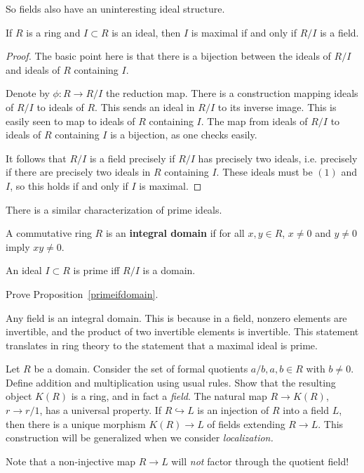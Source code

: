 So fields also have an uninteresting ideal structure.

\begin{corollary} If $R$ is a ring and $I \subset R$ is an ideal, then $I$ is
maximal if and only if $R/I$ is a field. \end{corollary}

\begin{proof} The basic point here is that there is a bijection between the
ideals of $R/I$ and ideals of $R$ containing $I$.

Denote by $\phi: R \to R/I$ the reduction map. There is a construction mapping
ideals of $R/I$ to ideals of $R$. This sends an ideal in $R/I$ to its inverse
image. This is easily seen to map to ideals of $R$ containing $I$. The map from
ideals of $R/I$ to ideals of $R$ containing $I$ is a bijection, as one checks
easily.

It follows that $R/I$ is a field precisely if $R/I$ has precisely two ideals,
i.e. precisely if there are precisely two ideals in $R$ containing $I$. These
ideals must be $(1)$ and $I$, so this holds if and only if $I$ is maximal.

\end{proof}

There is a similar characterization of prime ideals.

\begin{definition} A commutative ring $R$ is an \textbf{integral domain} if for
all $ x,y \in R$, $x \neq 0 $ and $y \neq 0$ imply $xy \neq 0$.
\end{definition}

\begin{proposition}\label{primeifdomain} An ideal $I \subset R$ is prime iff
$R/I$ is a domain. \end{proposition}

\begin{exercise} Prove Proposition~\ref{primeifdomain}. \end{exercise}

Any field is an integral domain. This is because in a field, nonzero elements
are invertible, and the product of two invertible elements is invertible. This
statement translates in ring theory to the statement that a maximal ideal is
prime.

\begin{exercise} Let $R$ be a domain. Consider the set of formal quotients
$a/b, a, b \in R$ with $b \neq 0$. Define addition and multiplication using
usual rules. Show that the resulting object $K(R)$ is a ring, and in fact a
\emph{field}. The natural map $R \to K(R)$, $r \to r/1$, has a universal
property. If $R \hookrightarrow L$ is an injection of $R$ into a field $L$,
then there is a unique morphism $K(R) \to L$ of fields extending $R \to L$.
This construction will be generalized when we consider \emph{localization.}

Note that a non-injective map $R\to L$ will \emph{not} factor through the
quotient field! \end{exercise}

